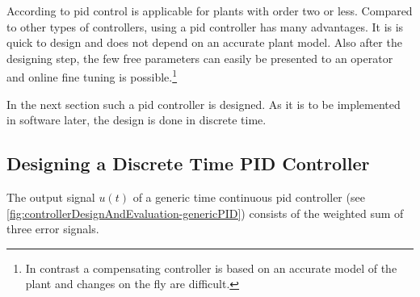 According to \cite[p.~111]{Aastroem1995} \gls{pid} control is applicable for plants with order two or less.
Compared to other types of controllers, using a \gls{pid} controller has many advantages. It is is quick to design and does not depend on an accurate plant model. Also after the designing step, the few free parameters can easily be presented to an operator and online fine tuning is possible.\footnote{In contrast a compensating controller is based on an accurate model of the plant and changes on the fly are difficult.\cite{SergeZacher2010}}

In the next section such a \gls{pid} controller is designed. As it is to be implemented in software later, the design is done in discrete time.

\subsection{Designing a Discrete Time PID Controller}\label{sec:controlDesign}
The output signal $u(t)$ of a generic time continuous \gls{pid} controller (see \autoref{fig:controllerDesignAndEvaluation-genericPID}) consists of the weighted sum of three error signals.

